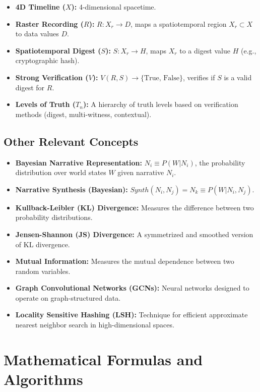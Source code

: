 \documentclass[12pt, a4paper]{article}
\begin{document}
\begin{itemize}
    \item \textbf{4D Timeline ($X$): } 4-dimensional spacetime.
    \item \textbf{Raster Recording ($R$): } $R: X_r \to D$, maps a spatiotemporal region $X_r \subset X$ to data values $D$.
    \item \textbf{Spatiotemporal Digest ($S$): } $S: X_r \to H$, maps $X_r$ to a digest value $H$ (e.g., cryptographic hash).
    \item \textbf{Strong Verification ($V$): } $V(R, S) \to \{\text{True, False}\}$, verifies if $S$ is a valid digest for $R$.
    \item \textbf{Levels of Truth ($T_n$): } A hierarchy of truth levels based on verification methods (digest, multi-witness, contextual).
\end{itemize}

\subsection{Other Relevant Concepts}

\begin{itemize}
    \item \textbf{Bayesian Narrative Representation:} $N_i \equiv P(W|N_i)$, the probability distribution over world states $W$ given narrative $N_i$.
    \item \textbf{Narrative Synthesis (Bayesian): } $Synth(N_i, N_j) = N_k \equiv P(W|N_i, N_j)$.
    \item \textbf{Kullback-Leibler (KL) Divergence:} Measures the difference between two probability distributions.
    \item \textbf{Jensen-Shannon (JS) Divergence:}  A symmetrized and smoothed version of KL divergence.
    \item \textbf{Mutual Information:} Measures the mutual dependence between two random variables.
    \item \textbf{Graph Convolutional Networks (GCNs): } Neural networks designed to operate on graph-structured data.
    \item \textbf{Locality Sensitive Hashing (LSH): }  Technique for efficient approximate nearest neighbor search in high-dimensional spaces.
\end{itemize}


\section{Mathematical Formulas and Algorithms}
\end{document}
